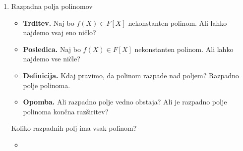 \begin{enumerate}
    \item Razpadna polja polinomov
    \begin{itemize}
        \item \textbf{Trditev.} Naj bo \(f(X) \in F[X]\) nekonstanten polinom. Ali lahko najdemo vsaj eno ničlo?
        \item \textbf{Posledica.} Naj bo \(f(X) \in F[X]\) nekonstanten polinom. Ali lahko najdemo vse ničle?
        \item \textbf{Definicija.} Kdaj pravimo, da polinom razpade nad poljem? Razpadno polje polinoma.
        \item \textbf{Opomba.} Ali razpadno polje vedno obstaja? Ali je razpadno polje polinoma končna razširitev?
    \end{itemize}

    Koliko razpadnih polj ima vsak polinom?
    \begin{itemize}
        \item 
    \end{itemize}

\end{enumerate}
